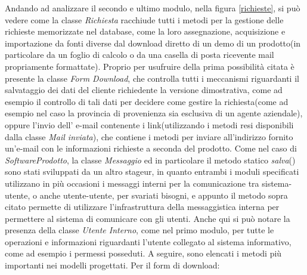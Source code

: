 \noindent
Andando ad analizzare il secondo e ultimo modulo, nella figura \ref{richieste}, si pu\`o vedere come la classe \textit{Richiesta} racchiude tutti i metodi per la gestione delle richieste memorizzate nel database, come la loro assegnazione, acquisizione e importazione da fonti diverse dal download diretto di un demo di un prodotto(in particolare da un foglio di calcolo o da una casella di posta ricevente mail propriamente formattate). Proprio per usufruire della prima possibilit\`a citata \`e presente la classe \textit{Form Download}, che controlla tutti i meccanismi riguardanti il salvataggio dei dati del cliente richiedente la versione dimostrativa, come ad esempio il controllo di tali dati per decidere come gestire la richiesta(come ad esempio nel caso la provincia di provenienza sia esclusiva di un agente aziendale), oppure l'invio dell' e-mail contenente i link(utilizzando i metodi resi disponibili dalla classe \textit{Mail inviata}), che contiene i metodi per inviare all'indirizzo fornito un'e-mail con le informazioni richieste a seconda del prodotto. Come nel caso di \textit{SoftwareProdotto}, la classe \textit{Messaggio} ed in particolare il metodo statico \textit{salva}() sono stati sviluppati da un altro stageur, in quanto entrambi i moduli specificati utilizzano in pi\`u occasioni i messaggi interni per la comunicazione tra sistema-utente, o anche utente-utente, per svariati bisogni, e appunto il metodo sopra citato permette di utilizzare l'infrastruttura della messaggistica interna per permettere al sistema di comunicare con gli utenti. Anche qui si pu\`o notare la presenza della classe \textit{Utente Interno}, come nel primo modulo, per tutte le operazioni e informazioni riguardanti l'utente collegato al sistema informativo, come ad esempio i permessi posseduti.
A seguire, sono elencati i metodi pi\`u importanti nei modelli progettati.
Per il form di download:

